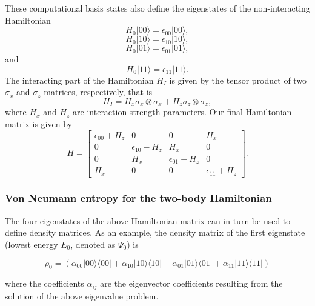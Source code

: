 \documentclass[onecolumn,10pt,cleanfoot]{asme2ej}
\begin{document}
These computational basis states also define the eigenstates of the non-interacting Hamiltonian
\begin{equation}
H_0 |00\rangle = \epsilon_{00} |00\rangle,
\end{equation}
\begin{equation}
H_0 |10\rangle = \epsilon_{10} |10\rangle,
\end{equation}
\begin{equation}
H_0 |01\rangle = \epsilon_{01} |01\rangle,
\end{equation}
and
\begin{equation}
H_0 |11\rangle = \epsilon_{11} |11\rangle.
\end{equation}
The interacting part of the Hamiltonian \(H_I\) is given by the tensor product of
two \(\sigma_x\) and \(\sigma_z\) matrices, respectively, that is
\begin{equation}
H_I = H_x \sigma_x \otimes \sigma_x + H_z \sigma_z \otimes \sigma_z,
\end{equation}
where \(H_x\) and \(H_z\) are interaction strength parameters. Our final Hamiltonian
matrix is given by
\begin{equation}
H = \begin{bmatrix}
\epsilon_{00} + H_z & 0 & 0 & H_x \\
0 & \epsilon_{10} - H_z & H_x & 0 \\
0 & H_x & \epsilon_{01} - H_z & 0 \\
H_x & 0 & 0 & \epsilon_{11} + H_z
\end{bmatrix}.
\end{equation}

\subsubsection{Von Neumann entropy for the two-body Hamiltonian}
The four eigenstates of the above Hamiltonian matrix can in turn be used to define density matrices. As an example, the density matrix of the first eigenstate (lowest energy \(E_0\), denoted as \(\Psi_0\)) is

\begin{equation}
\rho_0 = (\alpha_{00}|00\rangle\langle00| + \alpha_{10}|10\rangle\langle10| + \alpha_{01}|01\rangle\langle01| + \alpha_{11}|11\rangle\langle11|)
\end{equation}

where the coefficients \(\alpha_{ij}\) are the eigenvector coefficients resulting from the solution of the above eigenvalue problem.
\end{document}
